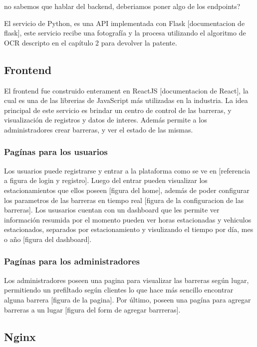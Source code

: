 {\huge no sabemos que hablar del backend, deberiamos poner algo de los endpoints?}

El servicio de Python, es una API implementada con Flask [documentacion de flask], este servicio recibe una fotografía y la procesa utilizando el algoritmo de OCR descripto en el capítulo 2 para devolver la patente.


\subsection{Frontend}

El frontend fue construido enterament en ReactJS [documentacion de React], la cual es una de las librerias de JavaScript más utilizadas en la industria. La idea principal de este servicio es brindar un centro de control de las barreras, y visualización de registros y datos de interes. Además permite a los administradores crear barreras, y ver el estado de las mismas.

\subsubsection*{Pagínas para los usuarios}

Los usuarios puede registrarse y entrar a la plataforma como se ve en [referencia a figura de login y registro]. Luego del entrar pueden visualizar los estacionamientos que ellos poseen [figura del home], además de poder configurar los parametros de las barreras en tiempo real [figura de la configuracion de las barreras]. Los ususarios cuentan con un dashboard que les permite ver información resumida por el momento pueden ver horas estacionadas y vehiculos estacionados, separados por estacionamiento y visulizando el tiempo por día, mes o año [figura del dashboard].

\subsubsection*{Pagínas para los administradores}

Los administradores poseen una pagina para visualizar las barreras según lugar, permitiendo un prefiltado según clientes lo que hace más sencillo encontrar alguna barrera [figura de la pagina]. Por último, poseen una pagína para agregar barreras a un lugar [figura del form de agregar barrreras].





\subsection{Nginx}